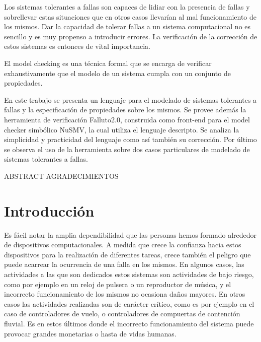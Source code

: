 \documentclass[titlepage, 12pt]{book}
\begin{document}
Los sistemas tolerantes a fallas son capaces de lidiar con la presencia de fallas y sobrellevar estas situaciones que en otros casos llevar\'ian al mal funcionamiento de los mismos. Dar la capacidad de tolerar fallas a un sistema computacional no es sencillo y es muy propenso a introducir errores. La verificaci\'on de la correcci\'on de estos sistemas es entonces de vital importancia.


El model checking es una t\'ecnica formal que se encarga de verificar exhaustivamente que el modelo de un sistema cumpla con un conjunto de propiedades.

En este trabajo se presenta un lenguaje para el modelado de sistemas tolerantes a fallas y la especificaci\'on de propiedades sobre los mismos. Se provee adem\'as la herramienta de verificaci\'on Falluto2.0, construida como front-end para el model checker simb\'olico NuSMV, la cual utiliza el lenguaje descripto. Se analiza la simplicidad y practicidad del lenguaje como as\'i tambi\'en su correcci\'on. Por \'ultimo se observa el uso de la herramienta sobre dos casos particulares de modelado de sistemas tolerantes a fallas.

 
\newpage
ABSTRACT
\newpage
AGRADECIMIENTOS

\newpage
\tableofcontents

\newpage


\chapter{Introducci\'on}
\label{introduccion}

Es f\'acil notar la amplia dependibilidad que las personas hemos formado alrededor de dispositivos computacionales. A medida que crece la confianza hacia estos dispositivos para la realizaci\'on de diferentes tareas, crece tambi\'en el peligro que puede acarrear la ocurrencia de una falla en los mismos. En algunos casos, las actividades a las que son dedicados estos sistemas son actividades de bajo riesgo, como por ejemplo en un reloj de pulsera o un reproductor de m\'usica, y el incorrecto funcionamiento de los mismos no ocasiona da\~nos mayores. En otros casos las actividades realizadas son de car\'acter cr\'itico, como es por ejemplo en el caso de controladores de vuelo, o controladores de compuertas de contenci\'on fluvial. Es en estos \'ultimos donde el incorrecto funcionamiento del sistema puede provocar grandes monetarias o hasta de vidas humanas.
\end{document}
